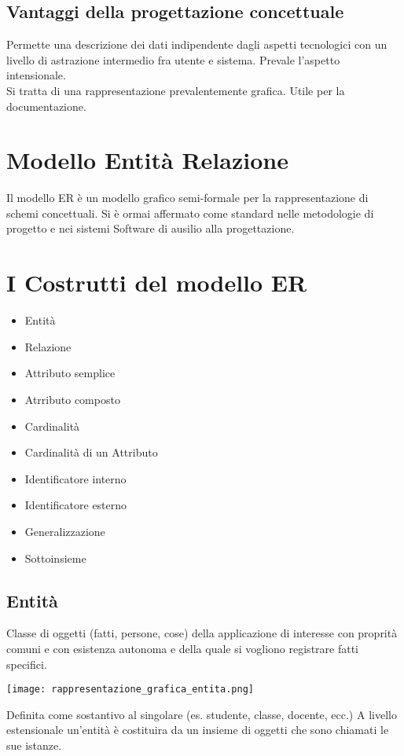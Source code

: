 \subsection{Vantaggi della progettazione concettuale}
Permette una descrizione dei dati indipendente dagli aspetti tecnologici con un
livello di astrazione intermedio fra utente e sistema. Prevale l'aspetto intensionale.
\\ Si tratta di una rappresentazione prevalentemente grafica. Utile per la documentazione.
\section{Modello Entità Relazione}
Il modello ER è un modello grafico semi-formale per la rappresentazione di schemi
concettuali. Si è ormai affermato come standard nelle metodologie di progetto e nei
sistemi Software di ausilio alla progettazione.
\section{I Costrutti del modello ER}
\begin{itemize}
    \item Entità
    \item Relazione
    \item Attributo semplice
    \item Atrributo composto
    \item Cardinalità
    \item Cardinalità di un Attributo
    \item Identificatore interno
    \item Identificatore esterno
    \item Generalizzazione
    \item Sottoinsieme
\end{itemize}

\subsection{Entità}
Classe di oggetti (fatti, persone, cose) della applicazione di interesse
con proprità comuni e con esistenza autonoma e della quale si vogliono
registrare fatti specifici.
\begin{center}
    \texttt{[image: rappresentazione\_grafica\_entita.png]}
\end{center}
Definita come sostantivo al singolare (es. studente, classe, docente, ecc.)
A livello estensionale un'entità è costituira da un insieme di oggetti 
che sono chiamati le sue istanze.
